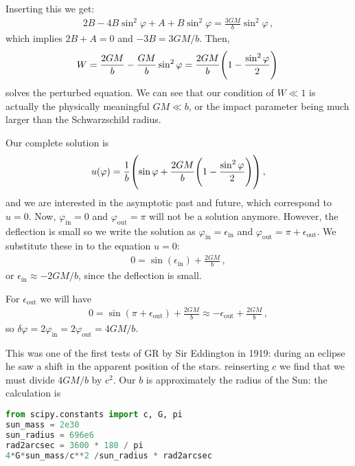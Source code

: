 \documentclass[main.tex]{subfiles}
\begin{document}
Inserting this we get:
%
\begin{align}
  2B - 4B \sin^2\varphi + A + B \sin^2\varphi 
  = \frac{3GM}{b} \sin^2\varphi 
\,,
\end{align}
%
which implies \(2B+A = 0\) and \(-3B = 3GM/b\). Then, 
%
\begin{align}
  W = \frac{2GM}{b} - \frac{GM}{b} \sin^2\varphi 
  = \frac{2GM}{b} \qty(1 - \frac{\sin^2\varphi}{2} )
\,
\end{align}
%
solves the perturbed equation. 
We can see that our condition of \(W \ll 1\) is actually the physically meaningful \(GM \ll b\), or the impact parameter being much larger than the Schwarzschild radius. 

Our complete solution is 
%
\begin{align}
  u (\varphi ) = \frac{1}{b} \qty(\sin \varphi + \frac{2GM}{b} \qty(1 - \frac{\sin^2\varphi}{2}))
\,,
\end{align}
%
and we are interested in the asymptotic past and future, which correspond to \(u =0\). 
Now, \(\varphi _{\text{in}}= 0\) and \(\varphi _{\text{out}} = \pi\) will not be a solution anymore. However, the deflection is small so we write the solution as \(\varphi _{\text{in}} = \epsilon _{\text{in}}\) and \(\varphi _{\text{out}} = \pi + \epsilon _{\text{out}}\).
We substitute these in to the equation \(u = 0\): 
%
\begin{align}
  0 = \sin(\epsilon _{\text{in}}) + \frac{2GM}{b}
\,,
\end{align}
%
or \(\epsilon _{\text{in}} \approx - 2GM/b\), since the deflection is small. 

For \(\epsilon _{\text{out}}\) we will have 
%
\begin{align}
  0= \sin(\pi + \epsilon _{\text{out}}) + \frac{2GM}{b} \approx - \epsilon _{\text{out}} + \frac{2GM}{b}
\,,
\end{align}
%
so \(\delta \varphi = 2 \varphi _{\text{in}} = 2 \varphi _{\text{out}} = 4GM/b\). 

This was one of the first tests of GR by Sir Eddington in 1919: during an eclipse he saw a shift in the apparent position of the stars. reinserting \(c\) we find that we must divide \(4GM/b\) by \(c^2\). 
Our \(b\) is approximately the radius of the Sun: the calculation is
\begin{lstlisting}[language=Python]
from scipy.constants import c, G, pi
sun_mass = 2e30
sun_radius = 696e6
rad2arcsec = 3600 * 180 / pi
4*G*sun_mass/c**2 /sun_radius * rad2arcsec
\end{lstlisting}
\end{document}
